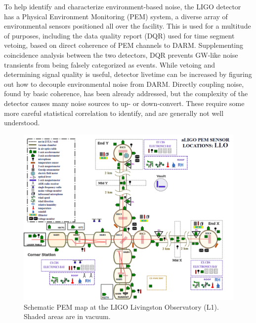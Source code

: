 \documentclass[colorlinks=true,pdfstartview=FitV,linkcolor=blue,
            citecolor=red,urlcolor=magenta]{ligodoc}
\begin{document}
To help identify and characterize environment-based noise, the LIGO detector has a Physical Environment Monitoring (PEM) system, a diverse array of environmental sensors positioned all over the facility.
This is used for a multitude of purposes, including the data quality report (DQR) used for time segment vetoing, based on direct coherence of PEM channels to DARM.
Supplementing coincidence analysis between the two detectors, DQR prevents GW-like noise transients from being falsely categorized as events.
While vetoing and determining signal quality is useful, detector livetime can be increased by figuring out how to decouple environmental noise from DARM.
Directly coupling noise, found by basic coherence, has been already addressed, but the complexity of the detector causes many noise sources to up- or down-convert.
These require some more careful statistical correlation to identify, and are generally not well understood.
\begin{figure}
\includegraphics[width=\textwidth]{llopem.png}
\caption{Schematic PEM map at the LIGO Livingston Observatory (L1). Shaded areas are in vacuum.}
\end{figure}
\end{document}
